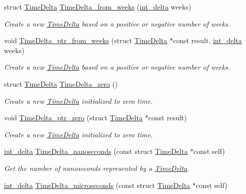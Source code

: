 \begin{DoxyCompactItemize}
struct \hyperlink{structTimeDelta}{Time\-Delta} \hyperlink{time-delta_8h_adeaef2754da892c29f03834c14ad1204}{Time\-Delta\-\_\-from\-\_\-weeks} (\hyperlink{types_8h_a8a67cf99971c5cfeeaa2380ba84a4c92}{int\-\_\-delta} weeks)
\begin{DoxyCompactList}\small\item\em Create a new \hyperlink{structTimeDelta}{Time\-Delta} based on a positive or negative number of weeks. \end{DoxyCompactList}\item 
void \hyperlink{time-delta_8h_a55e3b1a8b44c8805b04f52886a979d4f}{Time\-Delta\-\_\-ptr\-\_\-from\-\_\-weeks} (struct \hyperlink{structTimeDelta}{Time\-Delta} $\ast$const result, \hyperlink{types_8h_a8a67cf99971c5cfeeaa2380ba84a4c92}{int\-\_\-delta} weeks)
\begin{DoxyCompactList}\small\item\em Create a new \hyperlink{structTimeDelta}{Time\-Delta} based on a positive or negative number of weeks. \end{DoxyCompactList}\item 
struct \hyperlink{structTimeDelta}{Time\-Delta} \hyperlink{time-delta_8h_a4d78cdef19464e2c645923c831f38910}{Time\-Delta\-\_\-zero} ()
\begin{DoxyCompactList}\small\item\em Create a new \hyperlink{structTimeDelta}{Time\-Delta} initialized to zero time. \end{DoxyCompactList}\item 
void \hyperlink{time-delta_8h_ae37ea514d306a44df57cea83e2d42051}{Time\-Delta\-\_\-ptr\-\_\-zero} (struct \hyperlink{structTimeDelta}{Time\-Delta} $\ast$const result)
\begin{DoxyCompactList}\small\item\em Create a new \hyperlink{structTimeDelta}{Time\-Delta} initialized to zero time. \end{DoxyCompactList}\item 
\hyperlink{types_8h_a8a67cf99971c5cfeeaa2380ba84a4c92}{int\-\_\-delta} \hyperlink{time-delta_8h_a6bb384cf10338d51d1e40fdde5d032b8}{Time\-Delta\-\_\-nanoseconds} (const struct \hyperlink{structTimeDelta}{Time\-Delta} $\ast$const self)
\begin{DoxyCompactList}\small\item\em Get the number of nanoseconds represented by a \hyperlink{structTimeDelta}{Time\-Delta}. \end{DoxyCompactList}\item 
\hyperlink{types_8h_a8a67cf99971c5cfeeaa2380ba84a4c92}{int\-\_\-delta} \hyperlink{time-delta_8h_a64740843f3016de2bddd73ca40dc6465}{Time\-Delta\-\_\-microseconds} (const struct \hyperlink{structTimeDelta}{Time\-Delta} $\ast$const self)

\end{DoxyCompactItemize}
